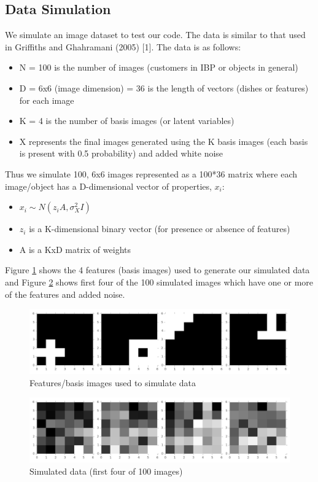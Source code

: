 \documentclass[11pt]{article}
\begin{document}
\subsection{Data Simulation}
We simulate an image dataset to test our code. The data is similar to that used in Griffiths and Ghahramani (2005) [1]. The data is as follows:
\begin{itemize}
  \item N = 100 is the number of images (customers in IBP or objects in general)
  \item D = 6x6 (image dimension) = 36 is the length of vectors (dishes or features) for each image
  \item K = 4 is the number of basis images (or latent variables)
  \item X represents the final images generated using the K basis images (each basis is present with 0.5 probability) and added white noise
\end{itemize}

Thus we simulate 100, 6x6 images represented as a 100*36 matrix where each image/object has a D-dimensional vector of properties, $x_{i}$:

\begin{itemize}
  \item $x_{i} \sim N(z_{i}A,\sigma_X^2I)$
  \item $z_{i}$ is a K-dimensional binary vector (for presence or absence of features)
  \item A is a KxD matrix of weights
\end{itemize}

Figure \ref{fig:feat} shows the 4 features (basis images) used to generate our simulated data and Figure \ref{fig:dataaa} shows first four of the 100 simulated images which have one or more of the features and added noise. 

\begin{figure}
\includegraphics[width=\linewidth]{data_files/features.png}
\caption {Features/basis images used to simulate data}
\label{fig:feat}
\end{figure}

\begin{figure}
\includegraphics[width=\linewidth]{data_files/data.png}
\caption {Simulated data (first four of 100 images)}
\label{fig:dataaa}
\end{figure}
\end{document}

